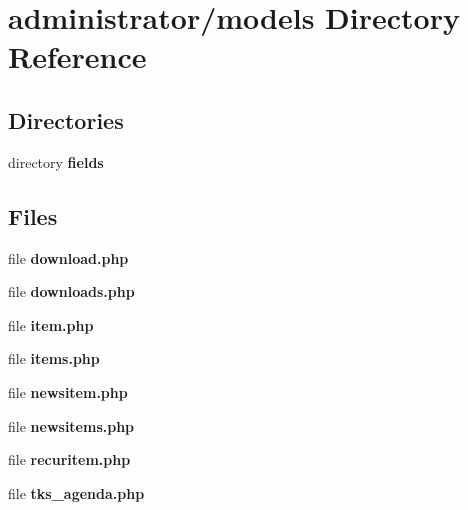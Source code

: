 \section{administrator/models Directory Reference}
\label{dir_2f82f8fdd8e9cb373dd06b9218f6d414}
\subsection*{Directories}
\begin{DoxyCompactItemize}
\item 
directory \textbf{ fields}
\end{DoxyCompactItemize}
\subsection*{Files}
\begin{DoxyCompactItemize}
\item 
file \textbf{ download.\+php}
\item 
file \textbf{ downloads.\+php}
\item 
file \textbf{ item.\+php}
\item 
file \textbf{ items.\+php}
\item 
file \textbf{ newsitem.\+php}
\item 
file \textbf{ newsitems.\+php}
\item 
file \textbf{ recuritem.\+php}
\item 
file \textbf{ tks\+\_\+agenda.\+php}
\end{DoxyCompactItemize}
